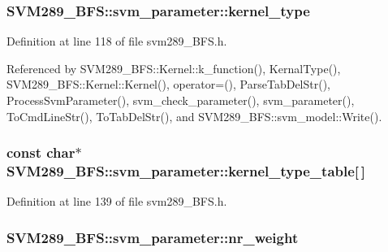 \subsubsection[{\texorpdfstring{kernel\+\_\+type}{kernel_type}}]{ S\+V\+M289\+\_\+\+B\+F\+S\+::svm\+\_\+parameter\+::kernel\+\_\+type}\hypertarget{struct_s_v_m289___b_f_s_1_1svm__parameter_a0855dd528ea40f3bb15d9de18c87a974}{}\label{struct_s_v_m289___b_f_s_1_1svm__parameter_a0855dd528ea40f3bb15d9de18c87a974}


Definition at line 118 of file svm289\+\_\+\+B\+F\+S.\+h.



Referenced by S\+V\+M289\+\_\+\+B\+F\+S\+::\+Kernel\+::k\+\_\+function(), Kernal\+Type(), S\+V\+M289\+\_\+\+B\+F\+S\+::\+Kernel\+::\+Kernel(), operator=(), Parse\+Tab\+Del\+Str(), Process\+Svm\+Parameter(), svm\+\_\+check\+\_\+parameter(), svm\+\_\+parameter(), To\+Cmd\+Line\+Str(), To\+Tab\+Del\+Str(), and S\+V\+M289\+\_\+\+B\+F\+S\+::svm\+\_\+model\+::\+Write().

\subsubsection[{\texorpdfstring{kernel\+\_\+type\+\_\+table}{kernel_type_table}}]{\setlength{\rightskip}{0pt plus 5cm}const char$\ast$ S\+V\+M289\+\_\+\+B\+F\+S\+::svm\+\_\+parameter\+::kernel\+\_\+type\+\_\+table\mbox{[}$\,$\mbox{]}\hspace{0.3cm}{\ttfamily [static]}}\hypertarget{struct_s_v_m289___b_f_s_1_1svm__parameter_ad2fecf32fd9f4c653ede8f2e7a66e60c}{}\label{struct_s_v_m289___b_f_s_1_1svm__parameter_ad2fecf32fd9f4c653ede8f2e7a66e60c}


Definition at line 139 of file svm289\+\_\+\+B\+F\+S.\+h.

\subsubsection[{\texorpdfstring{nr\+\_\+weight}{nr_weight}}]{ S\+V\+M289\+\_\+\+B\+F\+S\+::svm\+\_\+parameter\+::nr\+\_\+weight}\hypertarget{struct_s_v_m289___b_f_s_1_1svm__parameter_aa0f9140ef46b5f6ead1976985039bd3b}{}\label{struct_s_v_m289___b_f_s_1_1svm__parameter_aa0f9140ef46b5f6ead1976985039bd3b}


